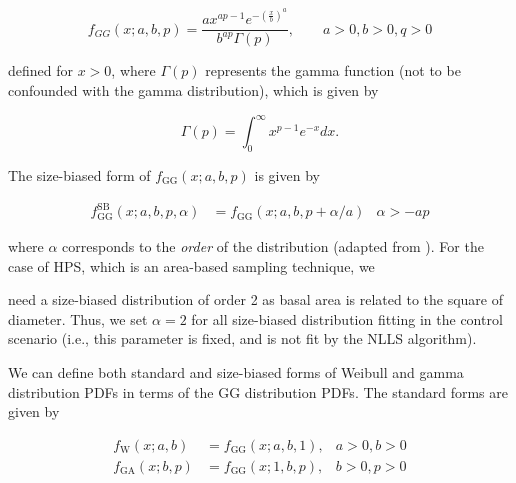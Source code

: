 \documentclass{foresj}
\begin{document}
\begin{equation}
f_{GG}(x; a, b, p) = \frac{ax^{ap-1}e^{-\left(\frac{x}{b}\right)^a}}{b^{ap}\Gamma(p)}, \qquad a > 0, b > 0, q > 0
\end{equation}

defined for $x > 0$, where $\Gamma(p)$ represents the gamma function (not to be confounded with the gamma distribution), which is given by

\begin{equation}
\Gamma(p) = \int_0^\infty x^{p-1}e^{-x} dx.
\end{equation}


The size-biased form of $f_{\text{GG}}(x; a, b, p)$ is given by 

\begin{align}
f^{\text{SB}}_{\text{GG}}(x; a, b, p, \alpha) &= f_{\text{GG}}(x;
                                                    a, b, p +
                                                    \alpha/a) & \alpha
                                                                > -ap
\end{align}

where $\alpha$ corresponds to the \emph{order} of the distribution (adapted from \citealp{ducey2015sizebiased}).
For the case of HPS, which is an area-based sampling technique, we

need a size-biased distribution of order 2 as basal area is related to
the square of diameter.
Thus, we set $\alpha=2$ for all size-biased distribution fitting in the control scenario (i.e., this parameter is fixed, and is not fit by the NLLS algorithm).


We can define both standard and size-biased forms
of Weibull and gamma distribution PDFs in terms of the GG distribution
PDFs.
The standard forms are given by


  \begin{align}
f_{\text{W}}(x; a, b) &= f_{\text{GG}}(x; a, b, 1), & a > 0, b > 0 \\
f_{\text{GA}}(x; b, p) &= f_{\text{GG}}(x; 1, b, p), & b > 0, p > 0
\end{align}
\end{document}
